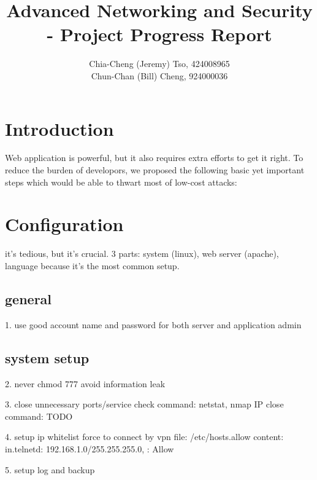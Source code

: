\documentclass[12pt, a4paper]{article}
\title{
    Advanced Networking and Security\\
    - Project Progress Report 
    \vspace{-2ex}
}
\author{
    \normalfont \normalsize 
    Chia-Cheng (Jeremy) Tso, 
    424008965\\
    \normalfont \normalsize 
    Chun-Chan (Bill) Cheng, 
    924000036
}
\date{
    \normalfont \normalsize 
    \vspace{-5ex}
}
\begin{document}
\maketitle
\section{Introduction}
Web application is powerful, but it also requires
extra efforts to get it right.%
To reduce the burden of developors,
we proposed the following basic yet important
steps which would be able to thwart most of low-cost attacks:

%   
\section{Configuration}
it's tedious, but it's crucial.
3 parts: system (linux), web server (apache), language
because it's the most common setup.

\subsection{general} %
1. use good account name and password
for both server and application admin

\subsection{system setup} %
2. never chmod 777
avoid information leak

3. close unnecessary ports/service
check command: netstat, nmap IP
close command: TODO

4. setup ip whitelist
force to connect by vpn
file: /etc/hosts.allow
content: in.telnetd: 192.168.1.0/255.255.255.0, : Allow

5. setup log and backup

%
\end{document}
